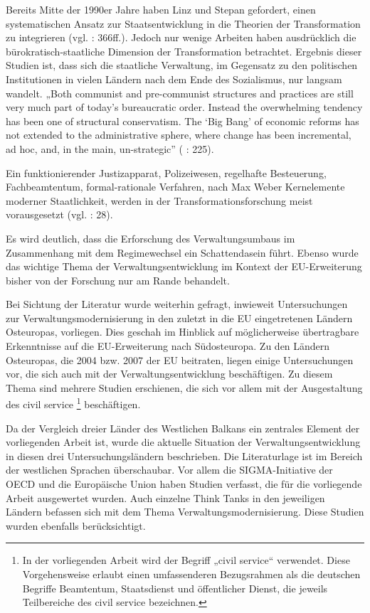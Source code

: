 \par
Bereits Mitte der 1990er Jahre haben Linz und Stepan gefordert, einen systematischen Ansatz zur Staatsentwicklung in die Theorien der Transformation zu integrieren (vgl. \cite{linz} : 366ff.). Jedoch nur wenige Arbeiten haben ausdrücklich die bürokratisch-staatliche Dimension der Transformation betrachtet. Ergebnis dieser Studien ist, dass sich die staatliche Verwaltung, im Gegensatz zu den politischen Institutionen in vielen Ländern nach dem Ende des Sozialismus, nur langsam wandelt. „Both communist and pre-communist structures and practices are still very much part of today’s bureaucratic order. Instead the overwhelming tendency has been one of structural conservatism. The ‘Big Bang’ of economic reforms has not extended to the administrative sphere, where change has been incremental, ad hoc, and, in the main, un-strategic” (\cite{dimgoe} : 225). 
\par
Ein funktionierender Justizapparat, Polizeiwesen, regelhafte Besteuerung, Fachbeamtentum, formal-rationale Verfahren, nach Max Weber Kernelemente moderner Staatlichkeit, werden in der Transformationsforschung meist vorausgesetzt (vgl. \cite{hens09} : 28).
\par
Es wird deutlich, dass die Erforschung des Verwaltungsumbaus im Zusammenhang mit dem Regimewechsel ein Schattendasein führt. Ebenso wurde das wichtige Thema der Verwaltungsentwicklung im Kontext der EU-Erweiterung bisher von der Forschung nur am Rande behandelt.
\par
Bei Sichtung der Literatur wurde weiterhin gefragt, inwieweit Untersuchungen zur Verwaltungsmodernisierung in den zuletzt in die EU eingetretenen Ländern Osteuropas, vorliegen. Dies geschah im Hinblick auf möglicherweise übertragbare Erkenntnisse auf die EU-Erweiterung nach Südosteuropa. Zu den Ländern Osteuropas, die 2004 bzw. 2007 der EU beitraten, liegen einige Untersuchungen vor, die sich auch mit der Verwaltungsentwicklung beschäftigen. Zu diesem Thema sind mehrere Studien erschienen, die sich vor allem mit der Ausgestaltung des civil service \footnote{In der vorliegenden Arbeit wird der Begriff „civil service“ verwendet. Diese Vorgehensweise erlaubt einen umfassenderen Bezugsrahmen als die deutschen Begriffe Beamtentum, Staatsdienst und öffentlicher Dienst, die jeweils Teilbereiche des civil service bezeichnen.} beschäftigen.
\par
Da der Vergleich dreier Länder des Westlichen Balkans ein zentrales Element der vorliegenden Arbeit ist, wurde die aktuelle Situation der Verwaltungsentwicklung in diesen drei Untersuchungsländern beschrieben. Die Literaturlage ist im Bereich der westlichen Sprachen überschaubar. Vor allem die SIGMA-Initiative der OECD und die Europäische Union haben Studien verfasst, die für die vorliegende Arbeit ausgewertet wurden. Auch einzelne Think Tanks in den jeweiligen Ländern befassen sich mit dem Thema Verwaltungsmodernisierung. Diese Studien wurden ebenfalls berücksichtigt.
